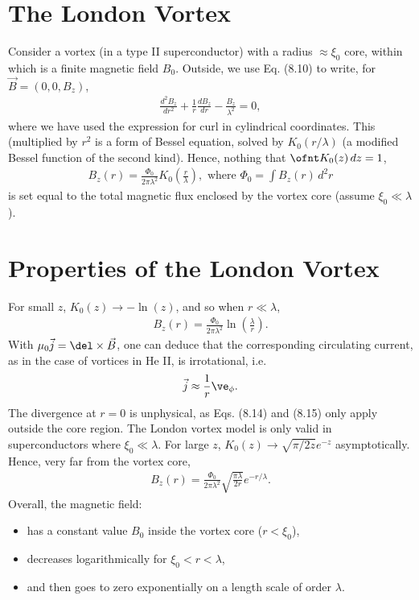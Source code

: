 \documentclass[qo.tex]{subfiles}
\begin{document}
\section{The London Vortex}
Consider a vortex (in a type II superconductor) with a radius $\approx\xi_0$ core, within which is a finite magnetic field $B_0$. 
Outside, we use Eq. (8.10) to write, for $\vec{B}=(0,0,B_z)$,
\begin{align}
    \frac{d^2 B_z}{dr^2} + \frac{1}{r}\frac{dB_z}{dr} - \frac{B_z}{\lambda^2} = 0,
\end{align}
where we have used the expression for curl in cylindrical coordinates. 
This (multiplied by $r^2$ is a form of Bessel equation, solved by $K_0(r/\lambda)$ (a modified Bessel function of the second kind).
Hence, nothing that $\ofnt K_0(z)\,dz = 1$,
\begin{align}
    B_z(r) = \frac{\Phi_0}{2\pi\lambda^2}K_0\left(\frac{r}{\lambda}\right), \text{ where } \Phi_0 = \int B_z(r)\,d^2r
\end{align}
is set equal to the total magnetic flux enclosed by the vortex core (assume $\xi_0\ll\lambda$).

\section{Properties of the London Vortex}
For small $z$, $K_0(z)\to-\ln(z)$, and so when $r\ll\lambda$,
\begin{align}
    B_z(r) = \frac{\Phi_0}{2\pi\lambda^2}\ln\left(\frac{\lambda}{r}\right).
\end{align}
With $\mu_0\vec{j}=\del\times\vec{B}$, one can deduce that the corresponding circulating current, as in the case of vortices in He II, is irrotational, i.e.
\begin{align}
    \vec{j} \approx \frac{1}{r}\ve_\phi.
\end{align}
The divergence at $r=0$ is unphysical, as Eqs. (8.14) and (8.15) only apply outside the core region. 
The London vortex model is only valid in superconductors where $\xi_0\ll\lambda$.
For large $z$, $K_0(z)\to\sqrt{\pi/2z}e^{-z}$ asymptotically.
Hence, very far from the vortex core, 
\begin{align}
    B_z(r) = \frac{\Phi_0}{2\pi\lambda^2}\sqrt{\frac{\pi\lambda}{2r}}e^{-r/\lambda}.
\end{align}
Overall, the magnetic field:
\begin{itemize}
    \item has a constant value $B_0$ inside the vortex core ($r<\xi_0$), 
    \item decreases logarithmically for $\xi_0<r<\lambda$,
    \item and then goes to zero exponentially on a length scale of order $\lambda$.
\end{itemize}
\end{document}

